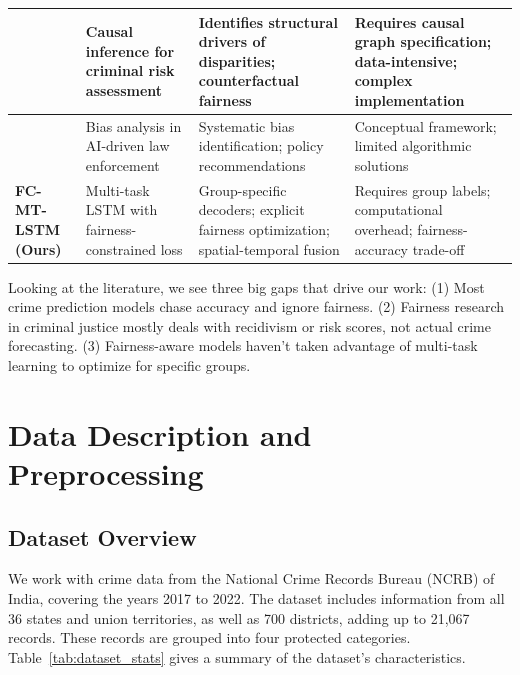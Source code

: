 \documentclass[conference]{IEEEtran}
\newcommand{\modelname}{FC-MT-LSTM}
\begin{document}
\begin{table}[htbp]
\begin{tabular}{p{2.2cm}p{2.8cm}p{4.2cm}p{4.2cm}}
\midrule
\cite{thompson2023causal} & Causal inference for criminal risk assessment & Identifies structural drivers of disparities; counterfactual fairness & Requires causal graph specification; data-intensive; complex implementation \\
\midrule
\cite{gupta2021bias} & Bias analysis in AI-driven law enforcement & Systematic bias identification; policy recommendations & Conceptual framework; limited algorithmic solutions \\
\midrule
\textbf{\modelname{} (Ours)} & Multi-task LSTM with fairness-constrained loss & Group-specific decoders; explicit fairness optimization; spatial-temporal fusion & Requires group labels; computational overhead; fairness-accuracy trade-off \\
\bottomrule
\end{tabular}
\end{table}

Looking at the literature, we see three big gaps that drive our work: (1) Most crime prediction models chase accuracy and ignore fairness. (2) Fairness research in criminal justice mostly deals with recidivism or risk scores, not actual crime forecasting. (3) Fairness-aware models haven't taken advantage of multi-task learning to optimize for specific groups.

\section{Data Description and Preprocessing}

\subsection{Dataset Overview}

We work with crime data from the National Crime Records Bureau (NCRB) of India, covering the years 2017 to 2022. The dataset includes information from all 36 states and union territories, as well as 700 districts, adding up to 21,067 records. These records are grouped into four protected categories. Table~\ref{tab:dataset_stats} gives a summary of the dataset's characteristics.
\end{document}
